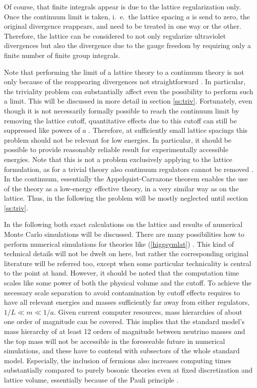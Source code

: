 \documentclass[final,12pt,3p,longtitle]{elsarticle}
\newcommand*{\pref}[1]{(\ref{#1})}
\newcommand*{\1}{1\!\!\!\bot}
\begin{document}
Of course, that finite integrals appear is due to the lattice regularization only. Once the continuum limit is taken, i.\ e.\ the lattice spacing $a$ is send to zero, the original divergence reappears, and need to be treated in one way or the other. Therefore, the lattice can be considered to not only regularize ultraviolet divergences but also the divergence due to the gauge freedom by requiring only a finite number of finite group integrals.

Note that performing the limit of a lattice theory to a continuum theory is not only because of the reappearing divergences not straightforward \cite{Montvay:1994cy,Gattringer:2010zz,DeGrand:2006zz}. In particular, the triviality problem \cite{Callaway:1988ya} can substantially affect even the possibility to perform such a limit. This will be discussed in more detail in section \ref{ss:triv}. Fortunately, even though it is not necessarily formally possible to reach the continuum limit by removing the lattice cutoff, quantitative effects due to this cutoff can still be suppressed like powers of $a$ \cite{Hasenfratz:1986za,Kuti:1987nr}. Therefore, at sufficiently small lattice spacings this problem should not be relevant for low energies. In particular, it should be possible to provide reasonably reliable result for experimentally accessible energies. Note that this is not a problem exclusively applying to the lattice formulation, as for a trivial theory also continuum regulators cannot be removed \cite{Callaway:1988ya}. In the continuum, essentially the Appelquist-Carrazone theorem \cite{Bohm:2001yx} enables the use of the theory as a low-energy effective theory, in a very similar way as on the lattice. Thus, in the following the problem will be mostly neglected until section \ref{ss:triv}.

In the following both exact calculations on the lattice and results of numerical Monte Carlo simulations will be discussed. There are many possibilities how to perform numerical simulations for theories like \pref{higgsymlat} \cite{Montvay:1994cy,DeGrand:2006zz}. This kind of technical details will not be dwelt on here, but rather the corresponding original literature will be referred too, except when some particular technicality is central to the point at hand. However, it should be noted that the computation time scales like some power of both the physical volume and the cutoff. To achieve the necessary scale separation to avoid contamination by cutoff effects requires to have all relevant energies and masses sufficiently far away from either regulators, $1/L\ll m\ll 1/a$. Given current computer resources, mass hierarchies of about one order of magnitude can be covered. This implies that the standard model's mass hierarchy of at least 12 orders of magnitude between neutrino masses and the top mass will not be accessible in the foreseeable future in numerical simulations, and these have to contend with subsectors of the whole standard model. Especially, the inclusion of fermions also increases computing times substantially compared to purely bosonic theories even at fixed discretization and lattice volume, essentially because of the Pauli principle \cite{Gattringer:2010zz,DeGrand:2006zz}.
\end{document}
